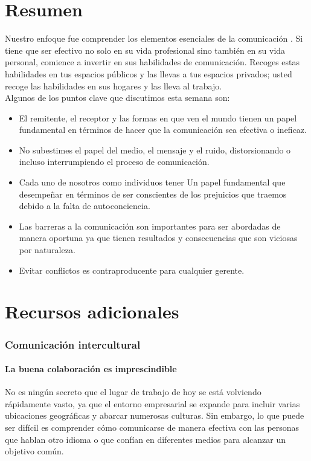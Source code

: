 \documentclass[10pt]{book}
\begin{document}
\section{Resumen}
Nuestro enfoque fue comprender los elementos esenciales de la comunicación . Si tiene que ser efectivo no solo en su vida profesional sino también en su vida personal, comience a invertir en sus habilidades de comunicación. Recoges estas habilidades en tus espacios públicos y las llevas a tus espacios privados; usted recoge las habilidades en sus hogares y las lleva al trabajo.\\
Algunos de los puntos clave que discutimos esta semana son:
\begin{itemize}
\item El remitente, el receptor y las formas en que ven el mundo tienen un papel fundamental en términos de hacer que la comunicación sea efectiva o ineficaz.
\item No subestimes el papel del medio, el mensaje y el ruido, distorsionando o incluso interrumpiendo el proceso de comunicación.
\item Cada uno de nosotros como individuos tener Un papel fundamental que desempeñar en términos de ser conscientes de los prejuicios que traemos debido a la falta de autoconciencia.
\item Las barreras a la comunicación son importantes para ser abordadas de manera oportuna ya que tienen resultados y consecuencias que son viciosas por naturaleza.
\item Evitar conflictos es contraproducente para cualquier gerente.
\end{itemize}
\section{Recursos adicionales}
\subsubsection{Comunicación intercultural}
\paragraph{La buena colaboración es imprescindible}
No es ningún secreto que el lugar de trabajo de hoy se está volviendo rápidamente vasto, ya que el entorno empresarial se expande para incluir varias ubicaciones geográficas y abarcar numerosas culturas. Sin embargo, lo que puede ser difícil es comprender cómo comunicarse de manera efectiva con las personas que hablan otro idioma o que confían en diferentes medios para alcanzar un objetivo común.
\end{document}
